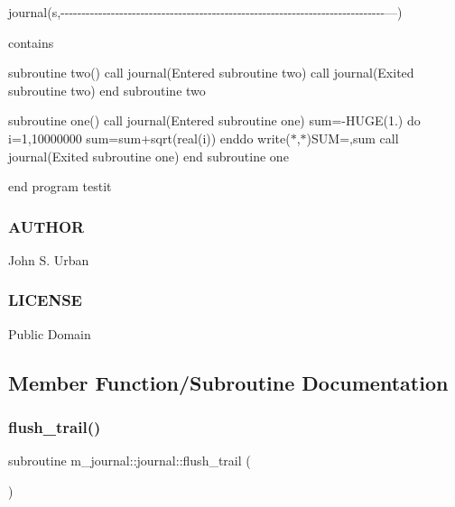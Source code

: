 journal(\textquotesingle{}s\textquotesingle{},\textquotesingle{}-\/-\/-\/-\/-\/-\/-\/-\/-\/-\/-\/-\/-\/-\/-\/-\/-\/-\/-\/-\/-\/-\/-\/-\/-\/-\/-\/-\/-\/-\/-\/-\/-\/-\/-\/-\/-\/-\/-\/-\/-\/-\/-\/-\/-\/-\/-\/-\/-\/-\/-\/-\/-\/-\/-\/-\/-\/-\/-\/-\/-\/-\/-\/-\/-\/-\/-\/-\/-\/-\/-\/-\/-\/-\/-\/-\/-\/---\textquotesingle{})

contains

subroutine two() call journal(\textquotesingle{}Entered subroutine two\textquotesingle{}) call journal(\textquotesingle{}Exited subroutine two\textquotesingle{}) end subroutine two

subroutine one() call journal(\textquotesingle{}Entered subroutine one\textquotesingle{}) sum=-\/\+H\+U\+GE(1.) do i=1,10000000 sum=sum+sqrt(real(i)) enddo write($\ast$,$\ast$)\textquotesingle{}S\+UM=\textquotesingle{},sum call journal(\textquotesingle{}Exited subroutine one\textquotesingle{}) end subroutine one

end program testit

\subsubsection*{A\+U\+T\+H\+OR}

John S. Urban

\subsubsection*{L\+I\+C\+E\+N\+SE}

Public Domain 

\subsection{Member Function/\+Subroutine Documentation}
\mbox{\label{interfacem__journal_1_1journal_acdde0ed4590797094f797514820e34fc}} 
\subsubsection{\texorpdfstring{flush\+\_\+trail()}{flush\_trail()}}
{\footnotesize\ttfamily subroutine m\+\_\+journal\+::journal\+::flush\+\_\+trail (\begin{DoxyParamCaption}{ }\end{DoxyParamCaption})\hspace{0.3cm}{\ttfamily [private]}}

